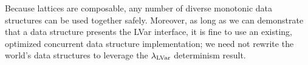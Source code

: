 Because lattices are composable, any number of diverse monotonic data
  structures can be used together safely.
Moreover, as long as we can demonstrate that a data structure presents the LVar interface, it is fine to use an
existing, optimized concurrent data structure implementation; we need not rewrite the world's
data structures to leverage the $\textup{\ensuremath{\lambda_{\textrm{LVar}}}}$ determinism result.


